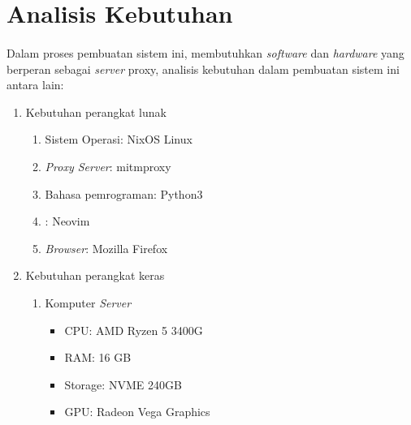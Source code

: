 \documentclass[./bab_3.tex]{subfiles}
\begin{document}
  \section{Analisis Kebutuhan}
  \paragraph*{}Dalam proses pembuatan sistem ini, membutuhkan
  \textit{software} dan \textit{hardware} yang berperan
  sebagai \textit{server} proxy, analisis kebutuhan dalam
  pembuatan sistem ini antara lain:
  \begin{enumerate}
    \item Kebutuhan perangkat lunak
    \begin{enumerate}
      \item Sistem Operasi: NixOS Linux
      \item \textit{Proxy Server}: mitmproxy
      \item Bahasa pemrograman: Python3
      \item {}: Neovim
      \item \textit{Browser}: Mozilla Firefox
    \end{enumerate}
    \item Kebutuhan perangkat keras
    \begin{enumerate}
      \item Komputer \textit{Server}
      \begin{itemize}
        \item CPU: AMD Ryzen 5 3400G
        \item RAM: 16 GB
        \item Storage: NVME 240GB
        \item GPU: Radeon Vega Graphics
      \end{itemize}
    \end{enumerate}
  \end{enumerate}
\end{document}
